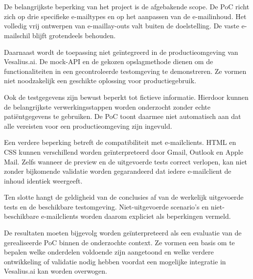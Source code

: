 \section{}%
\label{sec:beperkingen}
De belangrijkste beperking van het project is de afgebakende scope. De PoC
richt zich op drie specifieke e-mailtypes en op het aanpassen van de
e-mailinhoud. Het volledig vrij ontwerpen van e-maillay-outs valt buiten
de doelstelling. De vaste e-mailschil blijft grotendeels behouden.

Daarnaast wordt de toepassing niet geïntegreerd in de productieomgeving
van Vesalius.ai. De mock-API en de gekozen opslagmethode dienen om de
functionaliteiten in een gecontroleerde testomgeving te demonstreren.
Ze vormen niet noodzakelijk een geschikte oplossing voor productiegebruik.

Ook de testgegevens zijn bewust beperkt tot fictieve informatie. Hierdoor
kunnen de belangrijkste verwerkingsstappen worden onderzocht zonder echte
patiëntgegevens te gebruiken. De PoC toont daarmee niet automatisch aan
dat alle vereisten voor een productieomgeving zijn ingevuld.

Een verdere beperking betreft de compatibiliteit met e-mailclients.
HTML en CSS kunnen verschillend worden geïnterpreteerd door Gmail, Outlook
en Apple Mail. Zelfs wanneer de preview en de uitgevoerde tests correct
verlopen, kan niet zonder bijkomende validatie worden gegarandeerd dat
iedere e-mailclient de inhoud identiek weergeeft.

Ten slotte hangt de geldigheid van de conclusies af van de werkelijk
uitgevoerde tests en de beschikbare testomgeving. Niet-uitgevoerde
scenario's en niet-beschikbare e-mailclients worden daarom expliciet als
beperkingen vermeld.

De resultaten moeten bijgevolg worden geïnterpreteerd als een evaluatie van
de gerealiseerde PoC binnen de onderzochte context. Ze vormen een basis
om te bepalen welke onderdelen voldoende zijn aangetoond en welke verdere
ontwikkeling of validatie nodig hebben voordat een mogelijke integratie
in Vesalius.ai kan worden overwogen.
